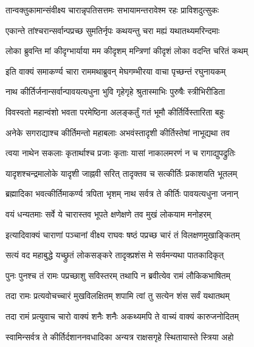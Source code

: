 \twolineshloka
{तान्वक्तुकामान्संवीक्ष्य चारान्नृपतिसत्तमः}
{सभायामन्तरावेश्म रहः प्राविशदुत्सुकः}%

\twolineshloka
{एकान्ते तांश्चरान्सर्वान्पप्रच्छ सुमतिर्नृपः}
{कथयन्तु चरा मह्यं यथातथ्यमरिन्दमाः}%

\twolineshloka
{लोका ब्रुवन्ति मां कीदृग्भार्याया मम कीदृशम्}
{मन्त्रिणां कीदृशं लोका वदन्ति चरितं कथम्}%

\twolineshloka
{इति वाक्यं समाकर्ण्य चारा राममथाब्रुवन्}
{मेघगम्भीरया वाचा पृच्छन्तं रघुनायकम्}%


\twolineshloka
{नाथ कीर्तिर्जनान्सर्वान्पावयत्यधुना भुवि}
{गृहेगृहे श्रुतास्माभिः पुरुषैः स्त्रीभिरीडिता}%

\twolineshloka
{विवस्वतो महान्वंशो भवता परमेष्ठिना}
{अलङ्कर्तुं गतं भूमौ कीर्तिर्विस्तारिता बहुः}%

\twolineshloka
{अनेके सगराद्याश्च कीर्तिमन्तो महाबलाः}
{अभवंस्तादृशी कीर्तिस्तेषां नाभूद्यथा तव}%

\twolineshloka
{त्वया नाथेन सकलाः कृतार्थाश्च प्रजाः कृताः}
{यासां नाकालमरणं न च रागाद्युपद्रुतिः}%

\twolineshloka
{यादृशश्चन्द्रमालोके यादृशी जाह्नवी सरित्}
{तादृक्तव च सत्कीर्तिः प्रकाशयति भूतलम्}%

\twolineshloka
{ब्रह्मादिका भवत्कीर्तिमाकर्ण्य त्रपिता भृशम्}
{नाथ सर्वत्र ते कीर्तिः पावयत्यधुना जनान्}%

\twolineshloka
{वयं धन्यतमाः सर्वे ये चारास्तव भूपते}
{क्षणेक्षणे तव मुखं लोकयाम मनोहरम्}%

\twolineshloka
{इत्यादिवाक्यं चाराणां पञ्चानां वीक्ष्य राघवः}
{षष्ठं पप्रच्छ चारं तं विलक्षणमुखाङ्कितम्}%


\twolineshloka
{सत्यं वद महाबुद्धे यच्छ्रुतं लोकसङ्करे}
{तादृक्प्रशंस मे सर्वमन्यथा पातकादिकृत्}%

\twolineshloka
{पुनः पुनश्च तं रामः पप्रच्छाशु सविस्तरम्}
{तथापि न ब्रवीत्येव रामं लौकिकभाषितम्}%

\twolineshloka
{तदा रामः प्रत्यवोचच्चारं मुखविलक्षितम्}
{शपामि त्वां तु सत्येन शंस सर्वं यथातथम्}%

\twolineshloka
{तदा रामं प्रत्युवाच चारो वाक्यं शनैः शनैः}
{अकथ्यमपि ते वाच्यं वाक्यं कारुजनोदितम्}%


\twolineshloka
{स्वामिन्सर्वत्र ते कीर्तिर्दशाननवधादिका}
{अन्यत्र राक्षसगृहे स्थितायास्ते स्त्रिया अहो}%


